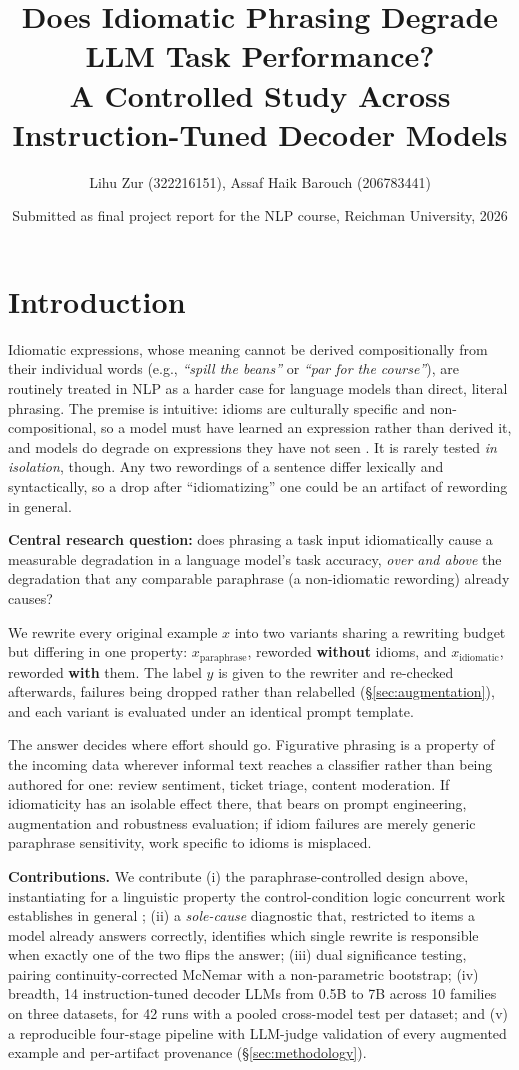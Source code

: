 \documentclass{article}   %
\title{Does Idiomatic Phrasing Degrade LLM Task Performance? \\
A Controlled Study Across Instruction-Tuned Decoder Models}
\author{Lihu Zur (322216151), Assaf Haik Barouch (206783441)}
\date{Submitted as final project report for the NLP course, Reichman University, 2026}
\newcommand{\citepf}[1]{\citep{#1}}
\begin{document}
\maketitle


\section{Introduction}
\label{sec:intro}

Idiomatic expressions, whose meaning cannot be derived compositionally from
their individual words (e.g., \emph{``spill the beans''} or \emph{``par for the
course''}), are routinely treated in NLP as a harder case for language models
than direct, literal phrasing. The premise is intuitive: idioms are culturally
specific and non-compositional, so a model must have learned an expression
rather than derived it, and models do degrade on expressions they have not seen
\citepf{tayyar2021astitch}. It is rarely tested \emph{in isolation}, though.
Any two rewordings of a sentence differ lexically and syntactically, so a drop
after ``idiomatizing'' one could be an artifact of rewording in general.

\textbf{Central research question:} does phrasing a task input
idiomatically cause a measurable degradation in a language model's task
accuracy, \emph{over and above} the degradation that any comparable
paraphrase (a non-idiomatic rewording) already causes?

We rewrite every original example $x$ into two variants sharing a rewriting
budget but differing in one property: $x_{\text{paraphrase}}$, reworded
\textbf{without} idioms, and $x_{\text{idiomatic}}$, reworded \textbf{with}
them. The label $y$ is given to the rewriter and re-checked afterwards, failures
being dropped rather than relabelled (\S\ref{sec:augmentation}), and each
variant is evaluated under an identical prompt template.

The answer decides where effort should go. Figurative phrasing is a property of
the incoming data wherever informal text reaches a classifier rather than being
authored for one: review sentiment, ticket triage, content moderation. If
idiomaticity has an isolable effect there, that bears on prompt engineering,
augmentation and robustness evaluation; if idiom failures are merely generic
paraphrase sensitivity, work specific to idioms is misplaced.

\textbf{Contributions.} We contribute (i) the paraphrase-controlled design
above, instantiating for a linguistic property the control-condition logic
concurrent work establishes in general \citepf{yang2026compared}; (ii) a
\emph{sole-cause} diagnostic that, restricted to items a model already answers
correctly, identifies which single rewrite is responsible when exactly one of
the two flips the answer; (iii) dual significance testing, pairing
continuity-corrected McNemar with a non-parametric bootstrap; (iv) breadth, 14
instruction-tuned decoder LLMs from 0.5B to 7B across 10 families on three
datasets, for 42 runs with a pooled cross-model test per dataset; and (v) a
reproducible four-stage pipeline with LLM-judge validation of every augmented
example and per-artifact provenance (\S\ref{sec:methodology}).
\end{document}
